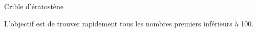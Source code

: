 \documentclass[activite]{thedocument}
\begin{document}
    \begin{center}
        \LARGE Crible d'ératostène
    \end{center}
    \vskip20pt
    L'objectif est de trouver rapidement tous les nombres premiers inférieurs à 100.
    \vskip20pt
    {\centering
    \par}
\end{document}
